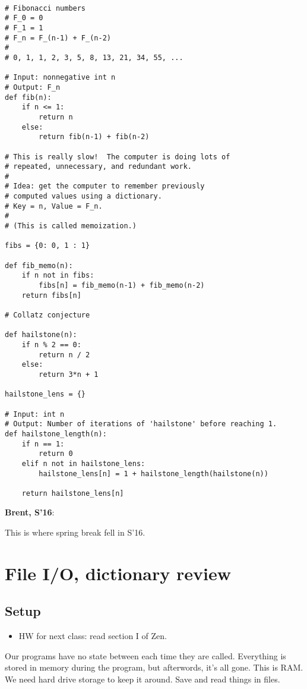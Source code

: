 \documentclass{article}
\newenvironment{reflect}[1]
{
  \noindent
  \begin{lrbox}{\reflectbox}
    \begin{minipage}[t]{\textwidth}
      \textbf{#1}:
}{
    \end{minipage}
  \end{lrbox}
  \fbox{\usebox{\reflectbox}}
}
\begin{document}
\begin{verbatim}

# Fibonacci numbers
# F_0 = 0
# F_1 = 1
# F_n = F_(n-1) + F_(n-2)
#
# 0, 1, 1, 2, 3, 5, 8, 13, 21, 34, 55, ...

# Input: nonnegative int n
# Output: F_n
def fib(n):
    if n <= 1:
        return n
    else:
        return fib(n-1) + fib(n-2)

# This is really slow!  The computer is doing lots of
# repeated, unnecessary, and redundant work.
#
# Idea: get the computer to remember previously
# computed values using a dictionary.
# Key = n, Value = F_n.
#
# (This is called memoization.)

fibs = {0: 0, 1 : 1}

def fib_memo(n):
    if n not in fibs:
        fibs[n] = fib_memo(n-1) + fib_memo(n-2)
    return fibs[n]

# Collatz conjecture

def hailstone(n):
    if n % 2 == 0:
        return n / 2
    else:
        return 3*n + 1

hailstone_lens = {}

# Input: int n
# Output: Number of iterations of 'hailstone' before reaching 1.
def hailstone_length(n):
    if n == 1:
        return 0
    elif n not in hailstone_lens:
        hailstone_lens[n] = 1 + hailstone_length(hailstone(n))

    return hailstone_lens[n]

\end{verbatim}

\newpage

\begin{reflect}{Brent, S'16}
  This is where spring break fell in S'16.
\end{reflect}

\section{File I/O, dictionary review}

\subsection*{Setup}

\begin{itemize}
\item HW for next class: read section I of Zen.
\end{itemize}

Our programs have no state between each time they are called.
Everything is stored in memory during the program, but afterwords,
it's all gone.  This is RAM.  We need hard drive storage to keep it
around.  Save and read things in files.
\end{document}
